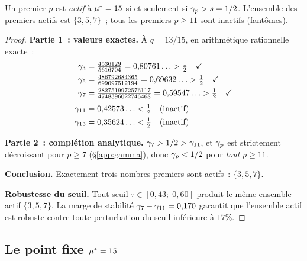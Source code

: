 \documentclass[12pt,a4paper]{article}
\begin{document}
\begin{theorembox}
Un premier $p$ est \emph{actif} \`a ${\mu^{*}} = 15$ si et seulement si
$\gamma_{p} > s = 1/2$. L'ensemble des premiers actifs est
$\{3, 5, 7\}$~; tous les premiers $p \geq 11$ sont inactifs (fant\^omes).

\begin{proof}
\textbf{Partie 1~: valeurs exactes.}
\`A $q = 13/15$, en arithm\'etique rationnelle exacte~:
\begin{align*}
\gamma_{3} &= \tfrac{4536129}{5616704} = 0{,}80761\ldots > \tfrac{1}{2} \quad \checkmark \\
\gamma_{5} &= \tfrac{486792684365}{699097512194} = 0{,}69632\ldots > \tfrac{1}{2} \quad \checkmark \\
\gamma_{7} &= \tfrac{2827519972576117}{4748396022746468} = 0{,}59547\ldots > \tfrac{1}{2} \quad \checkmark \\[3pt]
\gamma_{11} &= 0{,}42573\ldots < \tfrac{1}{2} \quad \text{(inactif)} \\
\gamma_{13} &= 0{,}35624\ldots < \tfrac{1}{2} \quad \text{(inactif)}
\end{align*}

\textbf{Partie 2~: compl\'etion analytique.}
$\gamma_{7} > 1/2 > \gamma_{11}$, et $\gamma_{p}$ est strictement
d\'ecroissant pour $p \geq 7$ (\S\ref{app:gamma}), donc
$\gamma_{p} < 1/2$ pour \emph{tout} $p \geq 11$.

\textbf{Conclusion.}
Exactement trois nombres premiers sont actifs~: $\{3, 5, 7\}$.

\medskip\noindent
\textbf{Robustesse du seuil.}
Tout seuil $\tau \in [0{,}43;\; 0{,}60]$ produit le m\^eme ensemble
actif $\{3, 5, 7\}$. La marge de stabilit\'e
$\gamma_{7} - \gamma_{11} = 0{,}170$ garantit que l'ensemble actif est
robuste contre toute perturbation du seuil inf\'erieure \`a $17\%$.
\end{proof}
\end{theorembox}

\subsection{Le point fixe ${\mu^{*}} = 15$}
\label{app:fixed_point}
\end{document}
